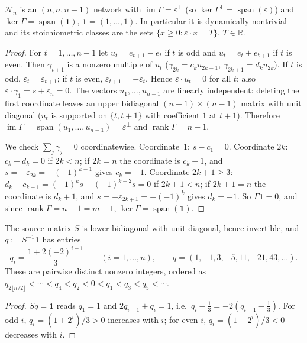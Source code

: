 \documentclass[11pt,a4paper]{report}
\newcommand{\Net}{\mathcal N}
\newcommand{\one}{\mathbf 1}
\providecommand{\im}{\operatorname{im}}
\providecommand{\spn}{\operatorname{span}}
\providecommand{\rank}{\operatorname{rank}}
\begin{document}
\begin{lemma}[note=stoichiometry]\label{lem:stoich}
\(\Net_n\) is an \((n,n,n-1)\) network with \(\im\Gamma=\varepsilon^\perp\) (so \(\ker\Gamma^{\mathsf T}=\spn(\varepsilon)\))
and \(\ker\Gamma=\spn(\one)\), \(\one=(1,\dots,1)\). In particular it is dynamically nontrivial and its
stoichiometric classes are the sets \(\{x\ge0:\varepsilon\cdot x=T\}\), \(T\in\mathbb R\).
\end{lemma}

\begin{proof}
For \(t=1,\dots,n-1\) let \(u_t=e_{t+1}-e_t\) if \(t\) is odd and \(u_t=e_t+e_{t+1}\) if \(t\) is even. Then
\(\gamma_{t+1}\) is a nonzero multiple of \(u_t\) (\(\gamma_{2k}=c_ku_{2k-1}\), \(\gamma_{2k+1}=d_ku_{2k}\)). If \(t\) is
odd, \(\varepsilon_t=\varepsilon_{t+1}\); if \(t\) is even, \(\varepsilon_{t+1}=-\varepsilon_t\). Hence
\(\varepsilon\cdot u_t=0\) for all \(t\); also \(\varepsilon\cdot\gamma_1=s+\varepsilon_n=0\). The vectors
\(u_1,\dots,u_{n-1}\) are linearly independent: deleting the first coordinate leaves an upper bidiagonal
\((n-1)\times(n-1)\) matrix with unit diagonal (\(u_t\) is supported on \(\{t,t+1\}\) with coefficient \(1\) at
\(t+1\)). Therefore \(\im\Gamma=\spn(u_1,\dots,u_{n-1})=\varepsilon^\perp\) and \(\rank\Gamma=n-1\).

We check \(\sum_j\gamma_j=0\) coordinatewise. Coordinate~1: \(s-c_1=0\). Coordinate \(2k\): \(c_k+d_k=0\) if \(2k<n\);
if \(2k=n\) the coordinate is \(c_k+1\), and \(s=-\varepsilon_{2k}=-(-1)^{k-1}\) gives \(c_k=-1\). Coordinate
\(2k+1\ge3\): \(d_k-c_{k+1}=(-1)^ks-(-1)^{k+2}s=0\) if \(2k+1<n\); if \(2k+1=n\) the coordinate is \(d_k+1\), and
\(s=-\varepsilon_{2k+1}=-(-1)^k\) gives \(d_k=-1\). So \(\Gamma\one=0\), and since \(\rank\Gamma=n-1=m-1\),
\(\ker\Gamma=\spn(\one)\).
\end{proof}

\begin{lemma}[note=exponents]\label{lem:exponents}
The source matrix \(S\) is lower bidiagonal with unit diagonal, hence invertible, and \(q:=S^{-1}\one\) has entries
\[
q_i=\frac{1+2(-2)^{i-1}}{3}\qquad(i=1,\dots,n),\qquad q=(1,-1,3,-5,11,-21,43,\dots).
\]
These are pairwise distinct nonzero integers, ordered as
\(q_{2\lfloor n/2\rfloor}<\cdots<q_4<q_2<0<q_1<q_3<q_5<\cdots\).
\end{lemma}

\begin{proof}
\(Sq=\one\) reads \(q_1=1\) and \(2q_{i-1}+q_i=1\), i.e.\ \(q_i-\tfrac13=-2(q_{i-1}-\tfrac13)\). For odd \(i\),
\(q_i=(1+2^i)/3>0\) increases with \(i\); for even \(i\), \(q_i=(1-2^i)/3<0\) decreases with \(i\).
\end{proof}
\end{document}
